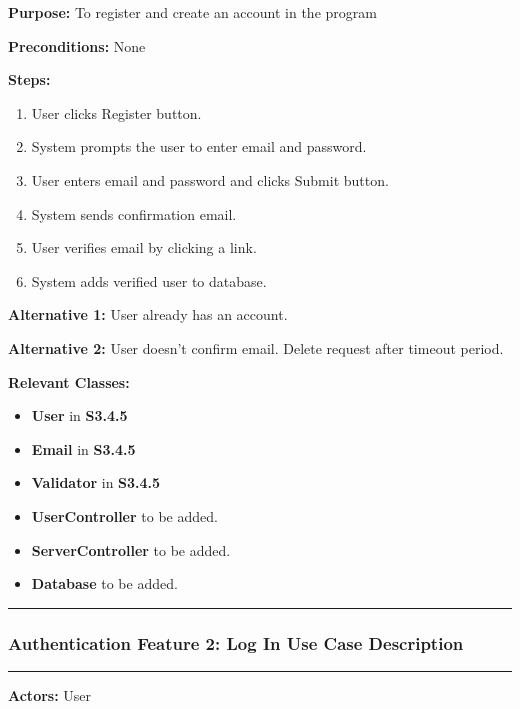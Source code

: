 \documentclass[twoside,letterpaper]{article}
\begin{document}
	\noindent\textbf{Purpose:} To register and create an account in the program \newline
	
	\noindent\textbf{Preconditions:} None \newline
	
	\noindent\textbf{Steps:} \begin{enumerate}
		\item User clicks Register button.
		\item System prompts the user to enter email and password.
		\item User enters email and password and clicks Submit button.
		\item System sends confirmation email.
		\item User verifies email by clicking a link.
		\item System adds verified user to database.
	\end{enumerate}
	\noindent\textbf{Alternative 1:} User already has an account. \newline
	
	\noindent\textbf{Alternative 2:} User doesn't confirm email. Delete request after timeout period. \newline
	
	\noindent\textbf{Relevant Classes:}
	\begin{itemize}
		\item \textbf{User} in \textbf{S3.4.5}
		\item \textbf{Email} in \textbf{S3.4.5}
		\item \textbf{Validator} in \textbf{S3.4.5}
		\item \textbf{UserController} to be added.
		\item \textbf{ServerController} to be added.
		\item \textbf{Database} to be added.
	\end{itemize}
	\vspace{8pt}
	\hrule
	\newpage
	
	\subsubsection[Authentication Feature 2: Log In Use Case Description]{\rmfamily\bfseries\color{black}
		Authentication Feature 2: Log In Use Case Description}
		\label{a:uc2}
	\hypertarget{RefHeading22059017292}{}
	
	\hrule
	\vspace{8pt}
	\noindent\textbf{Actors:} User \newline
	
\end{document}
